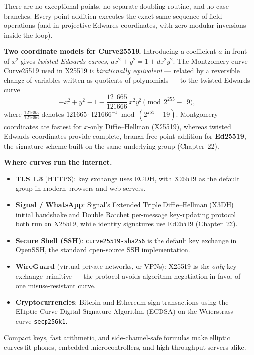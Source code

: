 There are no exceptional points, no separate doubling routine, and no case branches. Every
point addition executes the exact same sequence of field operations (and in projective
Edwards coordinates, with zero modular inversions inside the loop).

\begin{connectionbox}
\textbf{Two coordinate models for Curve25519.}
Introducing a coefficient $a$ in front of $x^2$ gives \emph{twisted Edwards curves},
$a x^2 + y^2 = 1 + d x^2 y^2$. The Montgomery curve Curve25519 used in X25519 is
\emph{birationally equivalent} --- related by a reversible change of variables written as
quotients of polynomials --- to the twisted Edwards curve
\[
-x^2 + y^2 \equiv 1 - \frac{121665}{121666}\,x^2 y^2 \pmod{2^{255}-19},
\]
where $\frac{121665}{121666}$ denotes $121665 \cdot 121666^{-1} \bmod (2^{255}-19)$.
Montgomery coordinates are fastest for $x$-only Diffie--Hellman (X25519), whereas twisted
Edwards coordinates provide complete, branch-free point addition for \textbf{Ed25519}, the
signature scheme built on the same underlying group (Chapter~22).
\end{connectionbox}

\begin{applicationbox}
\textbf{Where curves run the internet.}
\begin{itemize}
  \item \textbf{TLS 1.3} (HTTPS): key exchange uses ECDH, with X25519 as the default group
        in modern browsers and web servers.
  \item \textbf{Signal / WhatsApp}: Signal's Extended Triple Diffie--Hellman (X3DH)
        initial handshake and Double Ratchet per-message key-updating protocol both run on
        X25519, while identity signatures use Ed25519 (Chapter~22).
  \item \textbf{Secure Shell (SSH)}: \texttt{curve25519-sha256} is the default key
        exchange in OpenSSH, the standard open-source SSH implementation.
  \item \textbf{WireGuard} (virtual private networks, or VPNs): X25519 is the \emph{only}
        key-exchange primitive --- the protocol avoids algorithm negotiation in favor of
        one misuse-resistant curve.
  \item \textbf{Cryptocurrencies}: Bitcoin and Ethereum sign transactions using the
        Elliptic Curve Digital Signature Algorithm (ECDSA) on the Weierstrass curve
        \texttt{secp256k1}.
\end{itemize}
Compact keys, fast arithmetic, and side-channel-safe formulas make elliptic curves fit
phones, embedded microcontrollers, and high-throughput servers alike.
\end{applicationbox}

